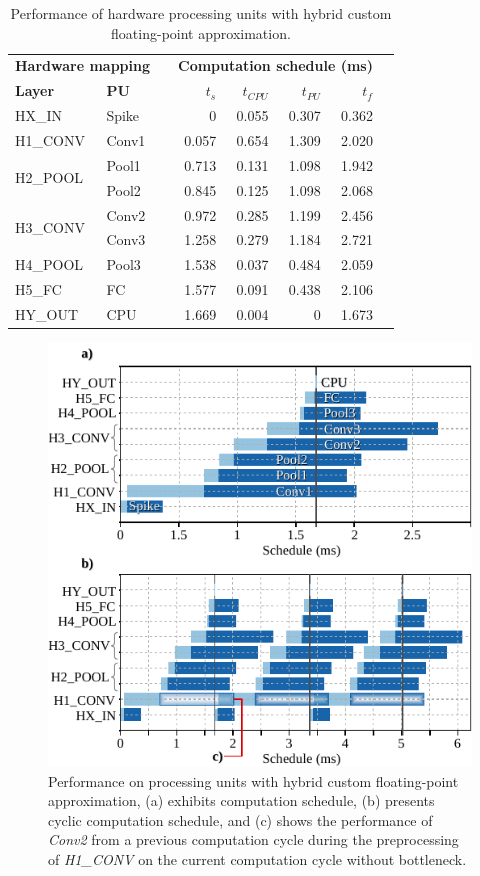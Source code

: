 \begin{table}[t!]\centering
	\caption{Performance of hardware processing units with hybrid custom floating-point approximation.}\label{tab:latency_cfp}
	\scriptsize
	\begin{tabular}{llrrrrrr}\toprule
		\multicolumn{2}{c}{\textbf{Hardware mapping}} & &\multicolumn{4}{c}{\textbf{Computation schedule (ms)}} \\\cmidrule{1-2}\cmidrule{4-7}
		\textbf{Layer} &\textbf{PU} & &$t_s$ &$t_{CPU}$ &$t_{PU}$ &$t_f$ \\\midrule
		HX\_IN &Spike & &0 &0.055 &0.307 &0.362 \\
		H1\_CONV &Conv1 & &0.057 &0.654 &1.309 &2.020 \\
		\multirow{2}{*}{H2\_POOL} &Pool1 & &0.713 &0.131 &1.098 &1.942 \\
		&Pool2 & &0.845 &0.125 &1.098 &2.068 \\
		\multirow{2}{*}{H3\_CONV} &Conv2 & &0.972 &0.285 &1.199 &2.456 \\
		&Conv3 & &1.258 &0.279 &1.184 &2.721 \\
		H4\_POOL &Pool3 & &1.538 &0.037 &0.484 &2.059 \\
		H5\_FC &FC & &1.577 &0.091 &0.438 &2.106 \\
		HY\_OUT &CPU & &1.669 &0.004 &0 &1.673 \\
		\bottomrule
	\end{tabular}
\end{table}

\begin{figure}[t!]
	\centering
	\includegraphics[width=1\columnwidth]{../figures/latency_cfp_cycle.pdf}
	\caption{Performance on processing units with hybrid custom floating-point approximation, (a) exhibits computation schedule, (b) presents cyclic computation schedule, and (c) shows the performance of \emph{Conv2} from a previous computation cycle during the preprocessing of \emph{H1\_CONV} on the current computation cycle without bottleneck.}
	\label{fig:latency_pu_cfp_cycle}
\end{figure}

